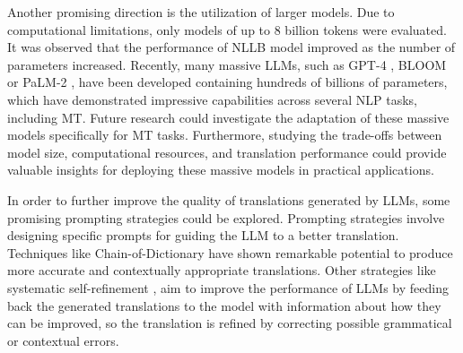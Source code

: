 \documentclass[11pt,english,listoffigures,listoftables]{tfgetsinf}
\begin{document}
Another promising direction is the utilization of larger models. Due to computational limitations, only models of up to 8 billion tokens were evaluated. It was observed that the performance of NLLB model improved as the number of parameters increased. Recently, many massive LLMs, such as GPT-4 \cite{achiam2023gpt4}, BLOOM \cite{workshop2022bloom} or PaLM-2 \cite{anil2023palm2}, have been developed containing hundreds of billions of parameters, which have demonstrated impressive capabilities across several NLP tasks, including MT. Future research could investigate the adaptation of these massive models specifically for MT tasks. Furthermore, studying the trade-offs between model size, computational resources, and translation performance could provide valuable insights for deploying these massive models in practical applications.
    
    
    

In order to further improve the quality of translations generated by LLMs, some promising prompting strategies could be explored. Prompting strategies involve designing specific prompts for guiding the LLM to a better translation. Techniques like Chain-of-Dictionary \cite{lu2023CoD} have shown remarkable potential to produce more accurate and contextually appropriate translations. Other strategies like systematic self-refinement \cite{feng2024self-correction}, aim to improve the performance of LLMs by feeding back the generated translations to the model with information about how they can be improved, so the translation is refined by correcting possible grammatical or contextual errors.
\end{document}
